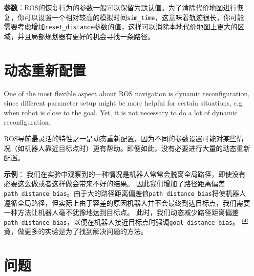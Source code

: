 \textbf{参数}：ROS的恢复行为的参数一般可以保留为默认值。为了清除代价地图进行恢复，你可以设置一个相对较高的模拟时间\texttt{sim\_time}，这意味着轨迹很长，你可能需要考虑增加\texttt{reset\_distance}参数的值，这样可以消除本地代价地图上更大的区域，并且局部规划器有更好的机会寻找一条路径。

\section[Dynamic Reconfigure]{动态重新配置}%

One of the most flexible aspect about ROS navigation is dynamic reconfiguration, since different parameter setup might be more helpful for certain situations, e.g. when robot is close to the goal. Yet, it is not necessary to do a lot of dynamic reconfiguration. 

ROS导航最灵活的特性之一是动态重新配置，因为不同的参数设置可能对某些情况（如机器人靠近目标点时）更有帮助。即便如此，没有必要进行大量的动态重新配置。



\textbf{示例}：
我们在实验中观察到的一种情况是机器人常常会脱离全局路径，即使没有必要这么做或者这样做会带来不好的结果。
因此我们增加了路径距离偏差\texttt{path\_distance\_bias}。由于大的路径距离偏差值\texttt{path\_distance\_bias}将使机器人遵循全局路径，但实际上由于容差的原因机器人并不会最终到达目标点，我们需要一种方法让机器人毫不犹豫地达到目标点。
此时，我们动态减少路径距离偏差\texttt{path\_distance\_bias}，以便在机器人接近目标点时强调\texttt{goal\_distance\_bias}。
毕竟，做更多的实验是为了找到解决问题的方法。

\section[Problems]{问题}%

